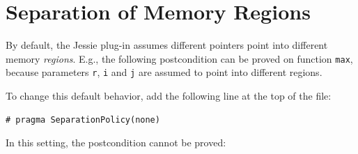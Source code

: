 \documentclass[a4paper,11pt,twoside,openright]{report}
\begin{document}


\chapter{Separation of Memory Regions}

By default, the Jessie plug-in assumes different pointers point into
different memory \textit{regions}.  E.g., the following postcondition
can be proved on function \verb|max|, because parameters \verb|r|,
\verb|i| and \verb|j| are assumed to point into different regions.



To change this default behavior, add the following line at the top of the file:
\begin{verbatim}
# pragma SeparationPolicy(none)
\end{verbatim}

In this setting, the postcondition cannot be proved:
\end{document}
